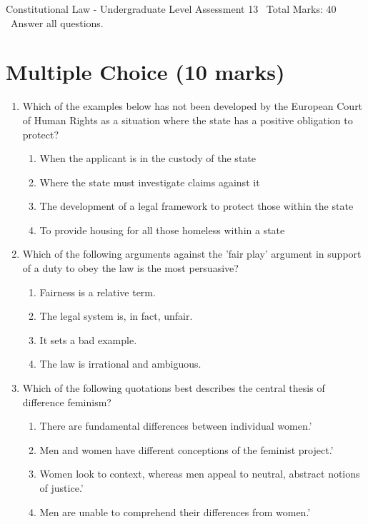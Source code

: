 \documentclass[12pt]{article}
\begin{document}
\begin{center}
Constitutional Law - Undergraduate Level Assessment 13 \
Total Marks: 40 \
Answer all questions.
\end{center}

\section*{Multiple Choice (10 marks)}
\begin{enumerate}[label=\arabic*.]
\item Which of the examples below has not been developed by the European Court of Human Rights as a situation where the state has a positive obligation to protect?
\begin{enumerate}[label=(\alph*)]
    \item When the applicant is in the custody of the state
    \item Where the state must investigate claims against it
    \item The development of a legal framework to protect those within the state
    \item To provide housing for all those homeless within a state
\end{enumerate}
\item Which of the following arguments against the 'fair play' argument in support of a duty to obey the law is the most persuasive?
\begin{enumerate}[label=(\alph*)]
    \item Fairness is a relative term.
    \item The legal system is, in fact, unfair.
    \item It sets a bad example.
    \item The law is irrational and ambiguous.
\end{enumerate}
\item Which of the following quotations best describes the central thesis of difference feminism?
\begin{enumerate}[label=(\alph*)]
    \item There are fundamental differences between individual women.'
    \item Men and women have different conceptions of the feminist project.'
    \item Women look to context, whereas men appeal to neutral, abstract notions of justice.'
    \item Men are unable to comprehend their differences from women.'
\end{enumerate}

\end{enumerate}
\end{document}
